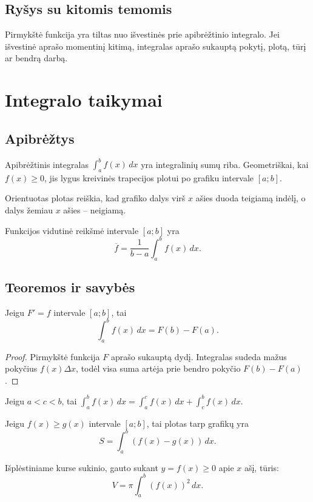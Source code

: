 \subsection{Ryšys su kitomis temomis}
Pirmykštė funkcija yra tiltas nuo išvestinės prie apibrėžtinio integralo. Jei išvestinė aprašo momentinį kitimą, integralas aprašo sukauptą pokytį, plotą, tūrį ar bendrą darbą.

\section{Integralo taikymai}\label{sec:integralo-taikymai}

\subsection{Apibrėžtys}
\begin{apibreztis}
Apibrėžtinis integralas \(\int_a^b f(x)\,dx\) yra integralinių sumų riba. Geometriškai, kai \(f(x)\ge0\), jis lygus kreivinės trapecijos plotui po grafiku intervale \([a;b]\).
\end{apibreztis}
\begin{apibreztis}
Orientuotas plotas reiškia, kad grafiko dalys virš \(x\) ašies duoda teigiamą indėlį, o dalys žemiau \(x\) ašies -- neigiamą.
\end{apibreztis}
\begin{apibreztis}
Funkcijos vidutinė reikšmė intervale \([a;b]\) yra
\[
\overline f=\frac{1}{b-a}\int_a^b f(x)\,dx.
\]
\end{apibreztis}

\subsection{Teoremos ir savybės}
\begin{teorema}
Jeigu \(F'=f\) intervale \([a;b]\), tai
\[
\int_a^b f(x)\,dx=F(b)-F(a).
\]
\end{teorema}
\begin{proof}
Pirmykštė funkcija \(F\) aprašo sukauptą dydį. Integralas sudeda mažus pokyčius \(f(x)\Delta x\), todėl visa suma artėja prie bendro pokyčio \(F(b)-F(a)\).
\end{proof}
\begin{savybe}
Jeigu \(a<c<b\), tai \(\int_a^b f(x)\,dx=\int_a^c f(x)\,dx+\int_c^b f(x)\,dx\).
\end{savybe}
\begin{savybe}
Jeigu \(f(x)\ge g(x)\) intervale \([a;b]\), tai plotas tarp grafikų yra
\[
S=\int_a^b (f(x)-g(x))\,dx.
\]
\end{savybe}
\begin{savybe}
Išplėstiniame kurse sukinio, gauto sukant \(y=f(x)\ge0\) apie \(x\) ašį, tūris:
\[
V=\pi\int_a^b (f(x))^2\,dx.
\]
\end{savybe}

